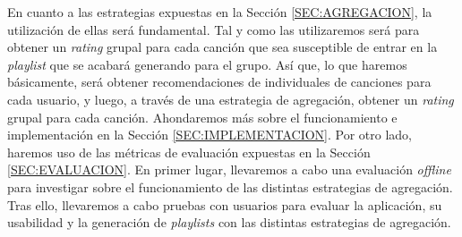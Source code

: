 En cuanto a las estrategias expuestas en la Sección \ref{SEC:AGREGACION}, la utilización de ellas será fundamental. Tal y como las utilizaremos será para obtener
un \textit{rating} grupal para cada canción que sea susceptible de entrar en la \textit{playlist} que se acabará generando para el grupo. Así que, lo que haremos
básicamente, será obtener recomendaciones de individuales de canciones para cada usuario, y luego, a través de una estrategia de agregación, obtener un 
\textit{rating} grupal para cada canción. Ahondaremos más sobre el funcionamiento e implementación en la Sección \ref{SEC:IMPLEMENTACION}. Por otro lado, 
haremos uso de las métricas de evaluación expuestas en la Sección \ref{SEC:EVALUACION}. En primer lugar, llevaremos a cabo una evaluación \textit{offline} 
para investigar sobre el funcionamiento de las distintas estrategias de agregación. Tras ello, llevaremos a cabo pruebas con usuarios para evaluar la aplicación, 
su usabilidad y la generación de \textit{playlists} con las distintas estrategias de agregación.